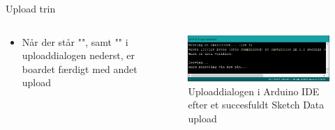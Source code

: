 \documentclass[aspectratio=169]{beamer}
\begin{document}
\begin{frame}{Upload trin}
\begin{columns}
	\begin{column}{0.5\textwidth}
		\begin{textBox}
			\begin{itemize}
				\item Når der står "", samt "" i uploaddialogen nederst, er boardet færdigt med andet upload
			\end{itemize}
		\end{textBox}
	\end{column}
	
	\begin{column}{0.5\textwidth}
		\begin{figure}
  			\includegraphics[width=\textwidth,keepaspectratio=true]{assets/pictures/sketchdatauploaded.png}
  			\caption{Uploaddialogen i Arduino IDE efter et succesfuldt Sketch Data upload}
  			\label{fig:sketchdatauploaded}
		\end{figure}
	\end{column}

\end{columns}
\end{frame}
\end{document}
